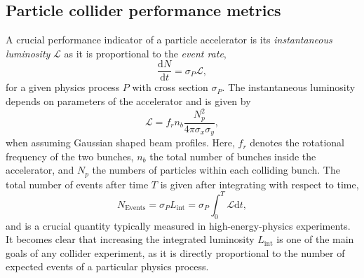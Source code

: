 \subsection{Particle collider performance metrics}
A crucial performance indicator of a particle accelerator is its \emph{instantaneous luminosity} $\mathcal{L}$ as it is proportional to the \emph{event rate}, 
\begin{equation}
    \frac{\mathrm{d}N}{\mathrm{d}t} = \sigma_{P} \mathcal{L},
\end{equation}
for a given physics process $P$ with cross section $\sigma_{P}$.
The instantaneous luminosity depends on parameters of the accelerator and is given by
\begin{equation}
  \mathcal{L} = f_rn_b\frac{N_p^2}{4\pi \sigma_x \sigma_y}, 
\end{equation}
when assuming Gaussian shaped beam profiles. Here, $f_r$ denotes the rotational frequency of the two bunches, $n_b$ the total number of bunches inside the accelerator, and $N_p$ the numbers of particles within each colliding bunch. 
The total number of events after time $T$ is given after integrating with respect to time, 
\begin{equation}
  N_{\text{Events}} = \sigma_{P} L_{\text{int}} = \sigma_{P} \int_{0}^{T} \mathcal{L} \mathrm{d}t,
\end{equation}
and is a crucial quantity typically measured in high-energy-physics experiments. 
It becomes clear that increasing the integrated luminosity $L_\text{int}$ is one of the main goals of any collider experiment, as it is directly proportional to the number of expected events of a particular physics process. 

